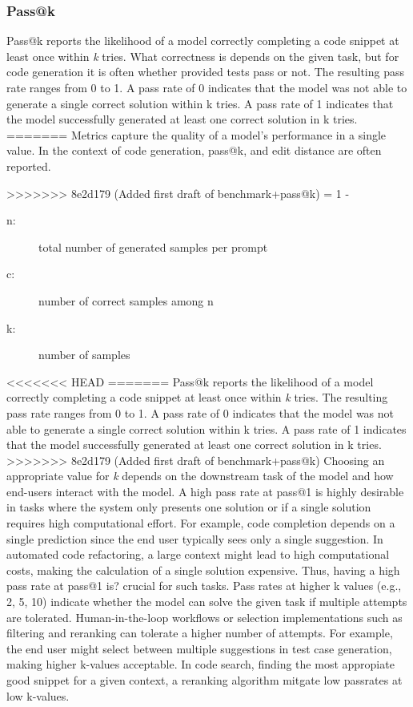 \documentclass[11pt]{article}
\begin{document}
\subsubsection{Pass@k}
Pass@k reports the likelihood of a model correctly completing a code snippet at least once within \emph{k} tries.
What correctness is depends on the given task, but for code generation it is often whether provided tests pass or not.
The resulting pass rate ranges from 0 to 1.
A pass rate of 0 indicates that the model was not able to generate a single correct solution within k tries.
A pass rate of 1 indicates that the model successfully generated at least one correct solution in k tries.
=======
Metrics capture the quality of a model's performance in a single value.
In the context of code generation, pass@k, and edit distance are often reported.

>>>>>>> 8e2d179 (Added first draft of benchmark+pass@k)
 = 1 - 
\begin{description}
    \item[n:] total number of generated samples per prompt
    \item[c:] number of correct samples among  n
    \item[k:] number of samples
\end{description}

<<<<<<< HEAD
=======
Pass@k reports the likelihood of a model correctly completing a code snippet at least once within \emph{k} tries.
The resulting pass rate ranges from 0 to 1.
A pass rate of 0 indicates that the model was not able to generate a single correct solution within k tries.
A pass rate of 1 indicates that the model successfully generated at least one correct solution in k tries.
>>>>>>> 8e2d179 (Added first draft of benchmark+pass@k)
Choosing an appropriate value for \emph{k} depends on the downstream task of the model and how end-users interact with the model.
A high pass rate at pass@1 is highly desirable in tasks where the system only presents one solution or if a single solution requires high computational effort.
For example, code completion depends on a single prediction since the end user typically sees only a single suggestion.
In automated code refactoring, a large context might lead to high computational costs, making the calculation of a single solution expensive.
Thus, having a high pass rate at pass@1 is? crucial for such tasks.
Pass rates at higher k values (e.g., 2, 5, 10) indicate whether the model can solve the given task if multiple attempts are tolerated.
Human-in-the-loop workflows or selection implementations such as filtering and reranking can tolerate a higher number of attempts.
For example, the end user might select between multiple suggestions in test case generation, making higher k-values acceptable.
In code search, finding the most appropiate good snippet for a given context, a reranking algorithm mitgate low passrates at low k-values.
\end{document}
